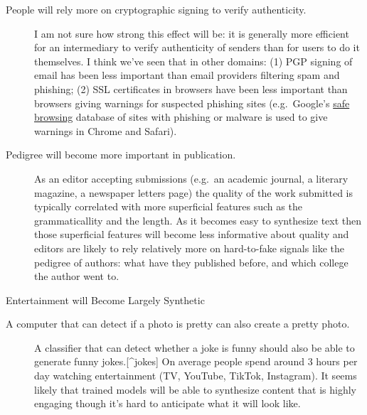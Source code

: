 \documentclass[
  10pt,
  ignorenonframetext,
]{beamer}
\begin{document}
\begin{frame}{}
\label{section-13}
\begin{description}
\item[People will rely more on cryptographic signing to verify
authenticity.]
I am not sure how strong this effect will be: it is generally more
efficient for an intermediary to verify authenticity of senders than for
users to do it themselves. I think we've seen that in other domains: (1)
PGP signing of email has been less important than email providers
filtering spam and phishing; (2) SSL certificates in browsers have been
less important than browsers giving warnings for suspected phishing
sites (e.g.~Google's \href{https://safebrowsing.google.com}{safe
browsing} database of sites with phishing or malware is used to give
warnings in Chrome and Safari).
\item[Pedigree will become more important in publication.]
As an editor accepting submissions (e.g.~an academic journal, a literary
magazine, a newspaper letters page) the quality of the work submitted is
typically correlated with more superficial features such as the
grammaticallity and the length. As it becomes easy to synthesize text
then those superficial features will become less informative about
quality and editors are likely to rely relatively more on hard-to-fake
signals like the pedigree of authors: what have they published before,
and which college the author went to.
\end{description}
\end{frame}

\begin{frame}{Entertainment will Become Largely Synthetic}
\label{entertainment-will-become-largely-synthetic}
\begin{description}
\item[A computer that can detect if a photo is pretty can also create a
pretty photo.]
A classifier that can detect whether a joke is funny should also be able
to generate funny jokes.{[}\^{}jokes{]} On average people spend around 3
hours per day watching entertainment (TV, YouTube, TikTok, Instagram).
It seems likely that trained models will be able to synthesize content
that is highly engaging though it's hard to anticipate what it will look
like.
\end{description}
\end{frame}
\end{document}
